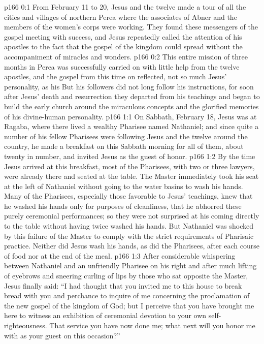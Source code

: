 \author{Midwayer Commission}
\vs p166 0:1 From February 11 to 20, Jesus and the twelve made a tour of all the cities and villages of northern Perea where the associates of Abner and the members of the women’s corps were working. They found these messengers of the gospel meeting with success, and Jesus repeatedly called the attention of his apostles to the fact that the gospel of the kingdom could spread without the accompaniment of miracles and wonders.
\vs p166 0:2 This entire mission of three months in Perea was successfully carried on with little help from the twelve apostles, and the gospel from this time on reflected, not so much Jesus’ personality, as his  But his followers did not long follow his instructions, for soon after Jesus’ death and resurrection they departed from his teachings and began to build the early church around the miraculous concepts and the glorified memories of his divine\hyp{}human personality.\plusone
{}%
\vs p166 1:1 On Sabbath, February 18, Jesus was at Ragaba, where there lived a wealthy Pharisee named Nathaniel; and since quite a number of his fellow Pharisees were following Jesus and the twelve around the country, he made a breakfast on this Sabbath morning for all of them, about twenty in number, and invited Jesus as the guest of honor.
\vs p166 1:2 By the time Jesus arrived at this breakfast, most of the Pharisees, with two or three lawyers, were already there and seated at the table. The Master immediately took his seat at the left of Nathaniel without going to the water basins to wash his hands. Many of the Pharisees, especially those favorable to Jesus’ teachings, knew that he washed his hands only for purposes of cleanliness, that he abhorred these purely ceremonial performances; so they were not surprised at his coming directly to the table without having twice washed his hands. But Nathaniel was shocked by this failure of the Master to comply with the strict requirements of Pharisaic practice. Neither did Jesus wash his hands, as did the Pharisees, after each course of food nor at the end of the meal.
\vs p166 1:3 After considerable whispering between Nathaniel and an unfriendly Pharisee on his right and after much lifting of eyebrows and sneering curling of lips by those who sat opposite the Master, Jesus finally said: \textcolor{ubdarkred}{“I had thought that you invited me to this house to break bread with you and perchance to inquire of me concerning the proclamation of the new gospel of the kingdom of God; but I perceive that you have brought me here to witness an exhibition of ceremonial devotion to your own self\hyp{}righteousness. That service you have now done me; what next will you honor me with as your guest on this occasion?”}
